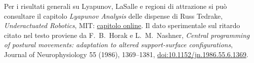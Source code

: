 \documentclass[11pt,a4paper,twoside=false,headinclude,footinclude]{scrartcl}
\begin{document}
Per i risultati generali su Lyapunov, LaSalle e regioni di attrazione si può consultare il capitolo \emph{Lyapunov Analysis} delle dispense di Russ Tedrake, \emph{Underactuated Robotics}, MIT: \href{https://underactuated.mit.edu/lyapunov.html}{capitolo online}. Il dato sperimentale sul ritardo citato nel testo proviene da F.~B.~Horak e L.~M.~Nashner, \emph{Central programming of postural movements: adaptation to altered support-surface configurations}, Journal of Neurophysiology 55 (1986), 1369--1381, \href{https://doi.org/10.1152/jn.1986.55.6.1369}{doi:10.1152/jn.1986.55.6.1369}.
\end{document}

